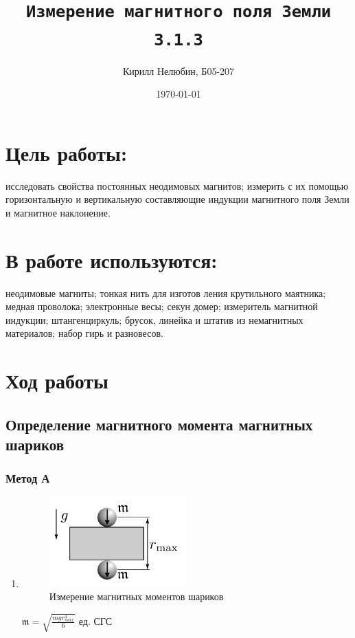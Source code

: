 \documentclass[11pt,a4paper]{article}
\title{\texttt{Измерение магнитного поля Земли \\ 3.1.3}}
\author{Кирилл Нелюбин, Б05-207}
\date{\today}
\begin{document}
\maketitle

\section*{Цель работы:}
исследовать свойства постоянных неодимовых магнитов;
измерить с их помощью горизонтальную и вертикальную составляющие
индукции магнитного поля Земли и магнитное наклонение.
\section*{В работе используются:}  
неодимовые магниты; тонкая нить для изготов­
ления крутильного маятника; медная проволока; электронные весы; секун­
домер; измеритель магнитной индукции; штангенциркуль; брусок, линейка
и штатив из немагнитных материалов; набор гирь и разновесов.


\section*{Ход работы}
\subsection*{Определение магнитного момента магнитных шариков}
\subsubsection*{Метод А}
\begin{enumerate}
  \item \begin{figure}[H]
    \includegraphics*[width=0.5\textwidth]{2023-10-01-23-50-52.png}
    \caption{Измерение магнитных моментов шариков}
    \label{ust:met_a}
  \end{figure}
  $\mathfrak{m}=\sqrt{\frac{mgr^4_{max}}{6}} \text{ ед. СГС}$
\end{enumerate}
\end{document}
